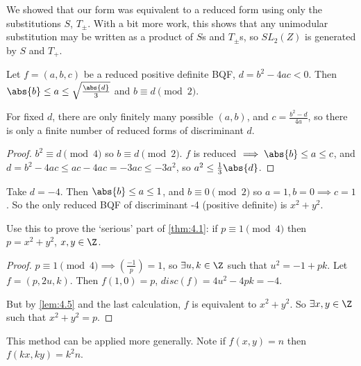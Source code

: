 \documentclass{article}
\newcommand{\legendre}[2]{\genfrac{(}{)}{}{}{#1}{#2}}
\begin{document}
\begin{remark}
    We showed that our form was equivalent to a reduced form using only the substitutions $S$, $T_\pm$.
    With a bit more work, this shows that any unimodular substitution may be written as a product of $S$s and $T_\pm$s, so $SL_2(Z)$ is generated by $S$ and $T_+$.
\end{remark}


\begin{nlemma}\label{lem:4.6}
    Let $f = (a,b,c)$ be a reduced positive definite BQF, $d = b^2 - 4ac < 0$.
    Then $\abs{b} \leq a \leq \sqrt{\frac{\abs{d}}{3}}$ and $b \equiv d \pmod{2}$.
\end{nlemma}

\begin{remark}
    For fixed $d$, there are only finitely many possible $(a, b)$, and $c = \frac{b^2 - d}{4a}$, so there is only a finite number of reduced forms of discriminant $d$.
\end{remark}

\begin{proof}
    $b^2 \equiv d \pmod{4}$ so $b \equiv d \pmod{2}$.
    $f$ is reduced $\implies \abs{b} \leq a \leq c$, and $d = b^2 - 4ac \leq ac - 4ac = -3ac \leq -3a^2$, so $a^2 \leq \frac{1}{3} \abs{d}$.
\end{proof}

\begin{eg}
    Take $d = -4$.
    Then $\abs{b} \leq a \leq 1$, and $b \equiv 0 \pmod{2}$ so $a = 1, b=0 \implies c=1$.
    So the only reduced BQF of discriminant -4 (positive definite) is $x^2 + y^2$.

    Use this to prove the `serious' part of \cref{thm:4.1}: if $p \equiv 1 \pmod{4}$ then $p = x^2 + y^2$, $x, y \in \Z$.

    \begin{proof}
        $p \equiv 1 \pmod{4} \implies \legendre{-1}{p} = 1$, so $\exists u, k \in \Z$ such that $u^2 = -1 + pk$.
        Let $f = (p, 2u, k)$. Then $f(1, 0) = p$, $disc(f) = 4u^2 - 4pk = -4$.

        But by \cref{lem:4.5} and the last calculation, $f$ is equivalent to $x^2 + y^2$. So $\exists x, y \in \Z$ such that $x^2 + y^2 = p$.
    \end{proof}
\end{eg}

This method can be applied more generally.
Note if $f(x, y) = n$ then $f(kx, ky) = k^2n$.
\end{document}
